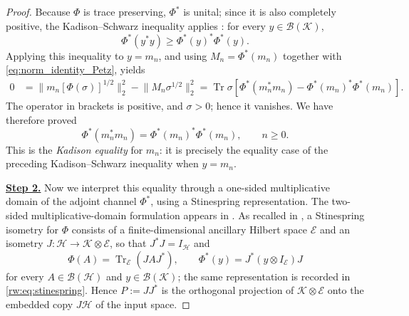 \documentclass[11pt]{article}
\theoremstyle{remark}
\newcommand{\1}{\mathbbm{1}}
\begin{document}
\begin{proof}
Because $\Phi$ is trace preserving, $\Phi^*$ is unital; since it is
also completely positive, the Kadison--Schwarz inequality applies
\cite{choi1974schwarz}:
for every $y\in\mathcal B(\mathcal K)$,
\[
 \Phi^*(y^*y)\geq \Phi^*(y)^*\Phi^*(y).
\]
Applying this inequality to $y=m_n$, and using
$M_n=\Phi^*(m_n)$ together with \eqref{eq:norm_identity_Petz}, yields
\begin{align*}
 0
 &=\lVert m_n[\Phi(\sigma)]^{1/2}\rVert_2^2
   -\lVert M_n\sigma^{1/2}\rVert_2^2=\operatorname{Tr}\sigma\left[
 \Phi^*(m_n^*m_n)-\Phi^*(m_n)^*\Phi^*(m_n)\right].
\end{align*}
The operator in brackets is positive, and $\sigma>0$; hence it
vanishes.  We have therefore proved
\begin{equation}
 \Phi^*(m_n^*m_n)
 =\Phi^*(m_n)^*\Phi^*(m_n),
 \qquad n\geq0.
 \label{eq:consolidated-Kadison-equality-mn}
\end{equation}
This is the \emph{Kadison equality} for $m_n$: it is precisely the
equality case of the preceding Kadison--Schwarz inequality when
$y=m_n$.

\smallskip
\noindent\underline{\textbf{Step 2.}}\enspace
Now we interpret this equality through a one-sided multiplicative
domain of the adjoint channel $\Phi^*$, using a Stinespring
representation.  The two-sided multiplicative-domain formulation appears in
\cite[Section~2.5, especially Eqs.~(2.12)--(2.13)]{hiai2017different}.
As recalled in , a Stinespring
isometry for $\Phi$ consists of a finite-dimensional ancillary Hilbert
space $\mathcal E$ and an isometry
$J:\mathcal H\to\mathcal K\otimes\mathcal E$, so that
$J^*J=I_{\mathcal H}$ and
\begin{equation}
 \Phi(A)=\operatorname{Tr}_{\mathcal E}(JAJ^*),\qquad
 \Phi^*(y)=J^*(y\otimes I_{\mathcal E})J
 \label{eq:consolidated-proof-Stinespring-representation}
\end{equation}
for every $A\in\mathcal B(\mathcal H)$ and
$y\in\mathcal B(\mathcal K)$; the same representation is recorded in
\eqref{rw:eq:stinespring}.  Hence $P:=JJ^*$ is the orthogonal
projection of $\mathcal K\otimes\mathcal E$ onto the embedded copy
$J\mathcal H$ of the input space.


\end{proof}
\end{document}
